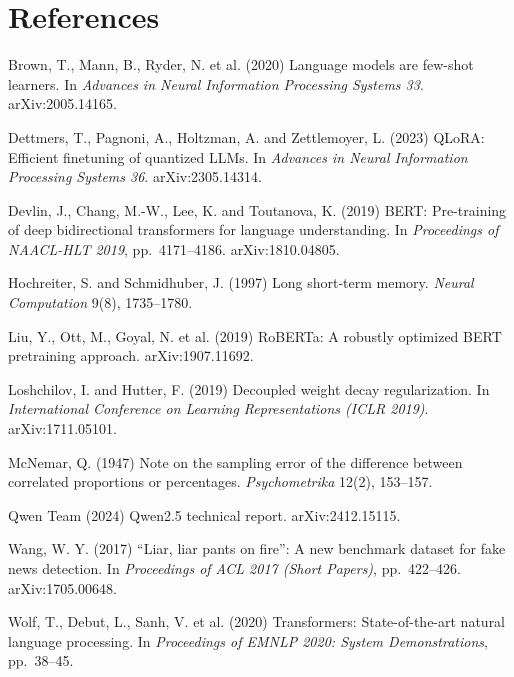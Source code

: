 \documentclass[10pt,a4paper,twoside]{article}
\begin{document}
\section*{References}
\begingroup\small\setlength{\parindent}{-1.2em}\setlength{\leftskip}{1.2em}\setlength{\parskip}{0.25em}

Brown, T., Mann, B., Ryder, N. et al. (2020) Language models are few-shot learners. In \emph{Advances in Neural Information Processing Systems 33}. arXiv:2005.14165.

Dettmers, T., Pagnoni, A., Holtzman, A. and Zettlemoyer, L. (2023) QLoRA: Efficient finetuning of quantized LLMs. In \emph{Advances in Neural Information Processing Systems 36}. arXiv:2305.14314.

Devlin, J., Chang, M.-W., Lee, K. and Toutanova, K. (2019) BERT: Pre-training of deep bidirectional transformers for language understanding. In \emph{Proceedings of NAACL-HLT 2019}, pp.\ 4171--4186. arXiv:1810.04805.

Hochreiter, S. and Schmidhuber, J. (1997) Long short-term memory. \emph{Neural Computation} 9(8), 1735--1780.

Liu, Y., Ott, M., Goyal, N. et al. (2019) RoBERTa: A robustly optimized BERT pretraining approach. arXiv:1907.11692.

Loshchilov, I. and Hutter, F. (2019) Decoupled weight decay regularization. In \emph{International Conference on Learning Representations (ICLR 2019)}. arXiv:1711.05101.

McNemar, Q. (1947) Note on the sampling error of the difference between correlated proportions or percentages. \emph{Psychometrika} 12(2), 153--157.

Qwen Team (2024) Qwen2.5 technical report. arXiv:2412.15115.

Wang, W. Y. (2017) ``Liar, liar pants on fire'': A new benchmark dataset for fake news detection. In \emph{Proceedings of ACL 2017 (Short Papers)}, pp.\ 422--426. arXiv:1705.00648.

Wolf, T., Debut, L., Sanh, V. et al. (2020) Transformers: State-of-the-art natural language processing. In \emph{Proceedings of EMNLP 2020: System Demonstrations}, pp.\ 38--45.

\endgroup
\end{document}

